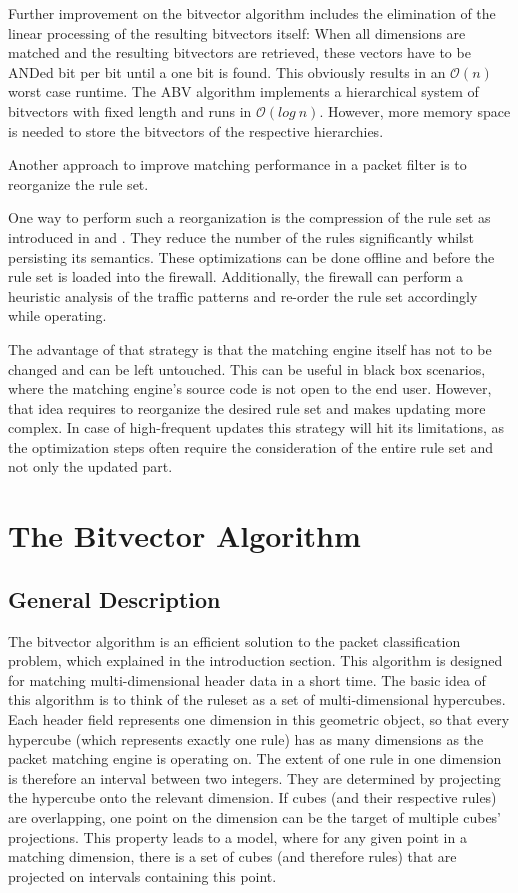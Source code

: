 \documentclass[a4paper,
		12pt,
		parskip=full,
		titlepage
		]{scrartcl}
\begin{document}
Further improvement on the bitvector algorithm includes the elimination of the linear processing of the resulting bitvectors itself:
When all dimensions are matched and the resulting bitvectors are retrieved, these vectors have to be ANDed bit per bit until a one bit is found.
This obviously results in an $\mathcal O(n)$ worst case runtime.
The ABV algorithm \cite{abv} implements a hierarchical system of bitvectors with fixed length and runs in $\mathcal O(log\ n)$.
However, more memory space is needed to store the bitvectors of the respective hierarchies.

Another approach to improve matching performance in a packet filter is to reorganize the rule set.

One way to perform such a reorganization is the compression of the rule set as introduced in \cite{firewall_compressor} and \cite{redundancy_removal}.
They reduce the number of the rules significantly whilst persisting its semantics.
These optimizations can be done offline and before the rule set is loaded into the firewall.
Additionally, the firewall can perform a heuristic analysis of the traffic patterns and re-order the rule set accordingly while operating.

The advantage of that strategy is that the matching engine itself has not to be changed and can be left untouched.
This can be useful in black box scenarios, where the matching engine's source code is not open to the end user.
However, that idea requires to reorganize the desired rule set and makes updating more complex.
In case of high-frequent updates this strategy will hit its limitations, as the optimization steps often require the consideration of the entire rule set and not only the updated part.

\section{The Bitvector Algorithm}
\subsection{General Description}
The bitvector algorithm \cite{bv} is an efficient solution to the packet classification problem, which explained in the introduction section.
This algorithm is designed for matching multi-dimensional header data in a short time.
The basic idea of this algorithm is to think of the ruleset as a set of multi-dimensional hypercubes.
Each header field represents one dimension in this geometric object, so that every hypercube (which represents exactly one rule) has as many dimensions as the packet matching engine is operating on.
The extent of one rule in one dimension is therefore an interval between two integers.
They are determined by projecting the hypercube onto the relevant dimension.
If cubes (and their respective rules) are overlapping, one point on the dimension can be the target of multiple cubes' projections. 
This property leads to a model, where for any given point in a matching dimension, there is a set of cubes (and therefore rules) that are projected on intervals containing this point.
\end{document}
